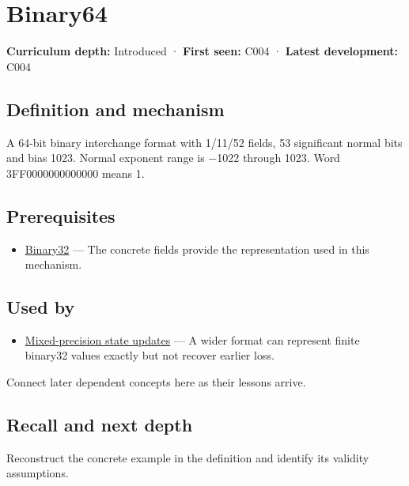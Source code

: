 \hypertarget{appendix-5078dfab64e6}{}
\section{Binary64}\label{appendix-5078dfab64e6-binary64}

\textbf{Curriculum depth:} Introduced · \textbf{First seen:} C004 · \textbf{Latest development:} C004

\subsection{Definition and mechanism}\label{appendix-5078dfab64e6-definition-and-mechanism}

A 64-bit binary interchange format with 1/11/52 fields, 53 significant normal bits and bias 1023. Normal exponent range is −1022 through 1023. Word 3FF0000000000000 means 1.

\subsection{Prerequisites}\label{appendix-5078dfab64e6-prerequisites}

\begin{itemize}
\tightlist
\item
  \hyperref[appendix-5057f9ad327f]{Binary32} --- The concrete fields provide the representation used in this mechanism.
\end{itemize}

\subsection{Used by}\label{appendix-5078dfab64e6-used-by}

\begin{itemize}
\tightlist
\item
  \hyperref[appendix-260182e617b7]{Mixed-precision state updates} --- A wider format can represent finite binary32 values exactly but not recover earlier loss.
\end{itemize}

Connect later dependent concepts here as their lessons arrive.

\subsection{Recall and next depth}\label{appendix-5078dfab64e6-recall-and-next-depth}

Reconstruct the concrete example in the definition and identify its validity assumptions.

